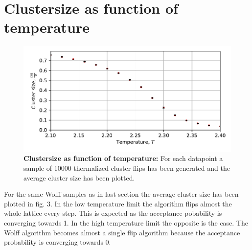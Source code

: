 \documentclass[11pt, a4paper]{scrartcl}
\begin{document}
\section{Clustersize as function of temperature}
    \begin{figure}
    \begin{centering}
        \includegraphics{clusters.pdf}
        \caption{\textbf{Clustersize as function of temperature: } For each datapoint a sample of 10000 thermalized cluster flips has been generated and the average cluster size has been plotted. }
    \end{centering}
    \end{figure}

    For the same Wolff samples as in last section the average cluster size has been plotted in fig. 3. In the low temperature limit the algorithm flips almost the whole lattice every step. This is expected as the acceptance pobability is converging towards 1. In the high temperature limit the opposite is the case. The Wolff algorithm becomes almost a single flip algorithm because the acceptance probability is converging towards 0.
\end{document}

